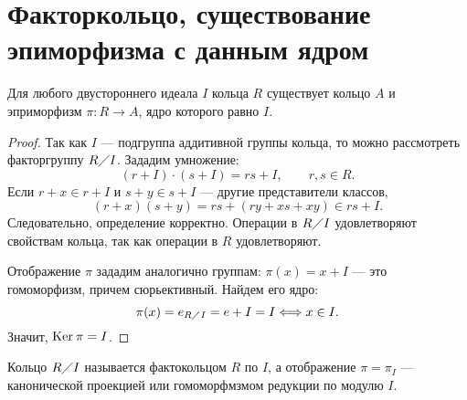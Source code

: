 \documentclass[11pt]{book}
\newcommand{\po}{\diagup}
\renewcommand{\ker}{{\mathop{\text{\rm Ker}}}\:}
\theoremstyle{definition}
\theoremstyle{plain}
\theoremstyle{plain}
\theoremstyle{definition}
\theoremstyle{remark}
\begin{document}
\section{Факторкольцо, существование эпиморфизма с данным ядром}
\begin{thm}
    Для любого двустороннего идеала $ I$ кольца  $ R$ существует кольцо  $ A$ и эприморфизм  $ \pi: R \to  A$, ядро которого равно $ I$.
\end{thm}
\begin{proof}
    Так как $ I$ --- подгруппа аддитивной группы кольца, то можно рассмотреть факторгруппу  $ R \diagup I$. Зададим умножение:
    \[
	(r + I) \cdot (s + I) = rs + I, \qquad r, s \in R
    .\]
    Если $ r + x \in  r + I$ и $ s + y \in s + I$ --- другие представители классов,
    \[
	(r + x) (s + y) = rs + (ry + xs + xy) \in  rs + I
    .\]
    Следовательно, определение корректно. Операции в $ R \po I $ удовлетворяют свойствам кольца,  так как операции в  $ R$ удовлетворяют.

    Отображение  $ \pi $ зададим аналогично группам: $ \pi(x) = x + I$ --- это гомоморфизм, причем сюрьективный.
    Найдем его ядро:
    \[
	\pi(x) = e_{R \po I} = e + I = I \Longleftrightarrow x \in I
    .\]
    Значит,  $ \ker \pi = I$.
\end{proof}
\begin{defn}
    Кольцо $ R \po I$ называется {\sf фактокольцом}  $ R$ по  $ I$, а отображение  $ \pi = \pi_I$ --- {\sf канонической проекцией} или {\sf гомоморфмзмом редукции по модулю $ I$}.
\end{defn}
\end{document}
